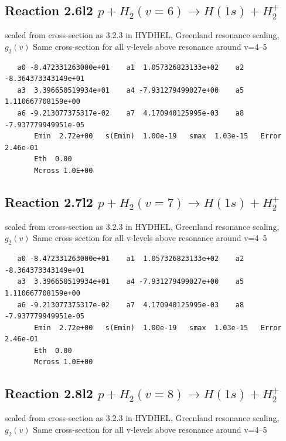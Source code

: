 \documentclass[12pt,dvipdfmx]{article}
\begin{document}
\subsection{
Reaction 2.6l2 $   p + H_2(v=6) \rightarrow H(1s) + H_2^+$}

scaled from cross-section as 3.2.3 in HYDHEL, Greenland resonance scaling, \cite{kn:Green} $g_2(v)$
Same cross-section for all v-levels above resonance around v=4--5

\begin{small}\begin{verbatim}
   a0 -8.472331263000e+01    a1  1.057326823133e+02    a2 -8.364373343149e+01
   a3  3.396650519934e+01    a4 -7.931279499027e+00    a5  1.110667708159e+00
   a6 -9.213077375317e-02    a7  4.170940125995e-03    a8 -7.937779949951e-05
       Emin  2.72e+00   s(Emin)  1.00e-19   smax  1.03e-15   Error  2.46e-01
       Eth  0.00
       Mcross 1.0E+00
\end{verbatim}\end{small}

\subsection{
Reaction 2.7l2 $   p + H_2(v=7) \rightarrow H(1s) + H_2^+$}

scaled from cross-section as 3.2.3 in HYDHEL, Greenland resonance scaling, \cite{kn:Green} $g_2(v)$
Same cross-section for all v-levels above resonance around v=4--5

\begin{small}\begin{verbatim}
   a0 -8.472331263000e+01    a1  1.057326823133e+02    a2 -8.364373343149e+01
   a3  3.396650519934e+01    a4 -7.931279499027e+00    a5  1.110667708159e+00
   a6 -9.213077375317e-02    a7  4.170940125995e-03    a8 -7.937779949951e-05
       Emin  2.72e+00   s(Emin)  1.00e-19   smax  1.03e-15   Error  2.46e-01
       Eth  0.00
       Mcross 1.0E+00
\end{verbatim}\end{small}

\subsection{
Reaction 2.8l2 $   p + H_2(v=8) \rightarrow H(1s) + H_2^+$}

scaled from cross-section as 3.2.3 in HYDHEL, Greenland resonance scaling, \cite{kn:Green} $g_2(v)$
Same cross-section for all v-levels above resonance around v=4--5
\end{document}
